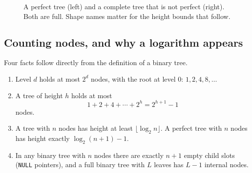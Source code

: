 \documentclass[11pt]{article}
\theoremstyle{definition}
\begin{document}
\begin{figure}[h]
  \centering
  \caption{A perfect tree (left) and a complete tree that is not perfect
    (right). Both are full. Shape names matter for the height bounds that
    follow.}
  \label{fig:shapes}
\end{figure}

\subsection{Counting nodes, and why a logarithm appears}

Four facts follow directly from the definition of a binary tree.

\begin{enumerate}
  \item Level $d$ holds at most $2^d$ nodes, with the root at level $0$:
    $1, 2, 4, 8, \dots$
  \item A tree of height $h$ holds at most
    \[
      1 + 2 + 4 + \cdots + 2^h = 2^{h+1} - 1
    \]
    nodes.
  \item A tree with $n$ nodes has height at least $\lfloor \log_2 n\rfloor$.
    A perfect tree with $n$ nodes has height exactly $\log_2(n+1)-1$.
  \item In any binary tree with $n$ nodes there are exactly $n+1$ empty child
    slots (\texttt{NULL} pointers), and a full binary tree with $L$ leaves
    has $L-1$ internal nodes.
\end{enumerate}
\end{document}
